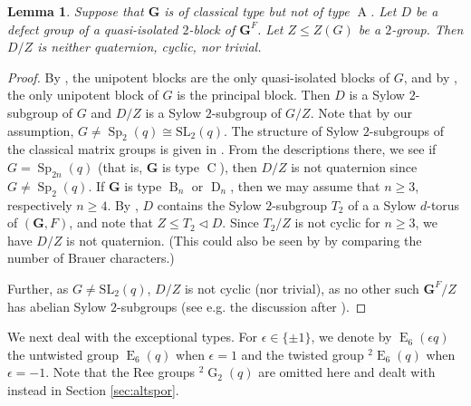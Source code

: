 \documentclass{amsart}
\theoremstyle{plain}\newtheorem{Theorem}{Theorem}[section]
\theoremstyle{plain}\newtheorem{Conjecture}[Theorem]{Conjecture}
\theoremstyle{plain}\newtheorem{Corollary}[Theorem]{Corollary}
\theoremstyle{plain}\newtheorem{Lemma}[Theorem]{Lemma}
\theoremstyle{plain}\newtheorem{Proposition}[Theorem]{Proposition}
\theoremstyle{definition}\newtheorem{Definition}[Theorem]{Definition}
\theoremstyle{definition}\newtheorem{Example}[Theorem]{Example}
\theoremstyle{definition}\newtheorem{Examples}[Theorem]{Examples}
\theoremstyle{definition}\newtheorem{Exercise}[Theorem]{Exercise}
\theoremstyle{definition}\newtheorem{Notation}[Theorem]{Notation}
\theoremstyle{definition}\newtheorem{Remark}[Theorem]{Remark}
\theoremstyle{definition}\newtheorem{Remarks}[Theorem]{Remarks}
\def\SL{\mathrm{SL}}
\newcommand{\bG}{{\mathbf{G}}}
\newcommand{\type}{\operatorname}
\newcommand{\tw}[1]{{}^#1\!}
\newcommand{\tA}{\type{A}}
\newcommand{\tB}{\type{B}}
\newcommand{\tC}{\type{C}}
\newcommand{\tD}{\type{D}}
\newcommand{\zent} {Z}
\numberwithin{equation}{section}
\begin{document}
\begin{Lemma}
    Suppose that  $\bG$ is of classical type but not of type $\tA$. Let $D$ be a defect group of a quasi-isolated $2$-block of $\bG^F$. Let $Z\leq \zent(G)$ be a $2$-group. Then $D/Z$ is neither quaternion, cyclic, nor trivial.
\end{Lemma}
\begin{proof}
    By \cite{bon}, the unipotent blocks are the only quasi-isolated blocks of $G$, and by \cite[Thm.~21.14]{CaEnbook}, the only unipotent block of $G$ is the principal block. Then $D$ is a Sylow $2$-subgroup of $G$ and $D/Z$ is a Sylow $2$-subgroup of $G/Z$. Note that by our assumption, $G\neq \operatorname{Sp}_2(q)\cong \SL_2(q)$. The structure of Sylow $2$-subgroups of the classical matrix groups is given in \cite{CarterFong}. From the descriptions there, we see if $G=\operatorname{Sp}_{2n}(q)$ (that is, $\bG$ is type $\tC$), then $D/Z$ is not quaternion since $G\neq\operatorname{Sp}_{2}(q)$. If $\bG$ is type $\tB_n$ or $\tD_n$, then we may assume that $n\geq 3$, respectively $n\geq 4$. By \cite[Thm.~4.10.2]{GLS3}, $D$ contains the Sylow $2$-subgroup $T_2$ of a a Sylow $d$-torus of $(\bG, F)$, and note that $Z\leq T_2\lhd D$. Since $T_2/Z$ is not cyclic for $n\geq 3$, we have $D/Z$ is not quaternion.
    (This could also be seen by \cite[Thm.~1.1]{kl20} by comparing the number of Brauer characters.)
    
    Further, as $G\neq\SL_2(q)$, $D/Z$ is not cyclic (nor trivial), as no other such $\bG^F/Z$ has abelian Sylow $2$-subgroups (see e.g. the discussion after \cite[Prop.~2.2]{Ma14}). 
\end{proof}

We next deal with the exceptional types. For $\epsilon\in\{\pm1\}$, we denote by $\type{E}_6(\epsilon q)$ the untwisted group $\type{E}_6(q)$ when $\epsilon=1$ and the twisted group $\tw{2}\type{E}_6(q)$ when $\epsilon=-1$. Note that the Ree groups $\tw{2}\type{G}_2(q)$ are omitted here and dealt with instead in Section \ref{sec:altspor}.
\end{document}
